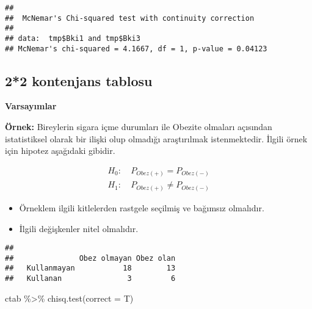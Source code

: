 \documentclass[
]{article}
\newenvironment{Shaded}{\begin{snugshade}}{\end{snugshade}}
\newcommand{\AttributeTok}[1]{\textcolor[rgb]{0.77,0.63,0.00}{#1}}
\newcommand{\CommentTok}[1]{\textcolor[rgb]{0.56,0.35,0.01}{\textit{#1}}}
\newcommand{\FunctionTok}[1]{\textcolor[rgb]{0.00,0.00,0.00}{#1}}
\newcommand{\NormalTok}[1]{#1}
\newcommand{\OtherTok}[1]{\textcolor[rgb]{0.56,0.35,0.01}{#1}}
\newcommand{\SpecialCharTok}[1]{\textcolor[rgb]{0.00,0.00,0.00}{#1}}
\providecommand{\tightlist}{%
  \setlength{\itemsep}{0pt}\setlength{\parskip}{0pt}}
\begin{document}
\begin{verbatim}
## 
##  McNemar's Chi-squared test with continuity correction
## 
## data:  tmp$Bki1 and tmp$Bki3
## McNemar's chi-squared = 4.1667, df = 1, p-value = 0.04123
\end{verbatim}

\hypertarget{kontenjans-tablosu}{%
\subsection{2*2 kontenjans tablosu}\label{kontenjans-tablosu}}

\textbf{Varsayımlar}

\textbf{Örnek:} Bireylerin sigara içme durumları ile Obezite olmaları
açısından istatistiksel olarak bir ilişki olup olmadığı araştırılmak
istenmektedir. İlgili örnek için hipotez aşağıdaki gibidir.

\begin{align*}
  H_0:&~ P_{Obez(+)} = P_{Obez(-)}  \\
  H_1:&~ P_{Obez(+)} \neq P_{Obez(-)}
\end{align*}

\begin{itemize}
\tightlist
\item
  Örneklem ilgili kitlelerden rastgele seçilmiş ve bağımsız olmalıdır.
\item
  İlgili değişkenler nitel olmalıdır.
\end{itemize}

\begin{Shaded}
\end{Shaded}

\begin{verbatim}
##              
##               Obez olmayan Obez olan
##   Kullanmayan           18        13
##   Kullanan               3         6
\end{verbatim}

\begin{Shaded}
\begin{Highlighting}[]
\NormalTok{ctab }\SpecialCharTok{\%\textgreater{}\%}
  \FunctionTok{chisq.test}\NormalTok{(}\AttributeTok{correct =}\NormalTok{ T)}
\end{Highlighting}
\end{Shaded}
\end{document}
